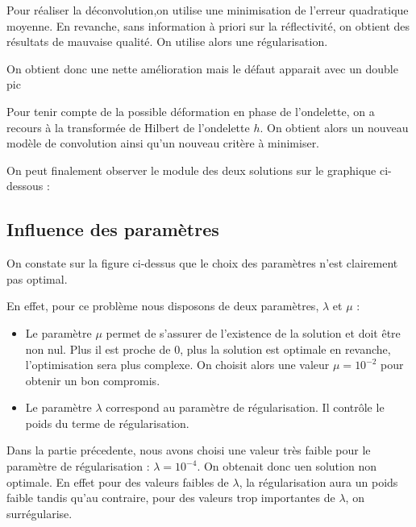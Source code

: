 \documentclass[12pt,a4paper,titlepage]{scrartcl}
\begin{document}

Pour réaliser la déconvolution,on utilise une minimisation de l'erreur
quadratique moyenne. En revanche, sans information à priori sur la
réflectivité, on obtient des résultats de mauvaise qualité. On utilise
alors une régularisation.


On obtient donc une nette amélioration mais le défaut apparait avec un
double pic


Pour tenir compte de la possible déformation en phase de l'ondelette,
on a recours à la transformée de Hilbert de l'ondelette $h$. On obtient
alors un nouveau modèle de convolution ainsi qu'un nouveau critère
à minimiser.



On peut finalement observer le module des deux solutions sur le graphique
ci-dessous :


\subsection{Influence des paramètres}

On constate sur la figure ci-dessus que le choix des paramètres n'est
clairement pas optimal.

En effet, pour ce problème nous disposons de deux paramètres, $\lambda$
et $\mu$ :

\begin{itemize}
    \item{Le paramètre $\mu$ permet de s'assurer de l'existence de la solution et
        doit être non nul. Plus il est proche de 0, plus la solution
        est optimale en revanche, l'optimisation sera plus complexe. On
        choisit alors une valeur $\mu = 10^{-2}$ pour obtenir un bon
        compromis.}
    \item{Le paramètre $\lambda$ correspond au paramètre de régularisation.
        Il contrôle le poids du terme de régularisation.}
\end{itemize}

Dans la partie précedente, nous avons choisi une valeur très faible pour
le paramètre de régularisation : $\lambda = 10^{-4}$. On obtenait donc
uen solution non optimale. En effet pour des valeurs faibles de $\lambda$,
la régularisation aura un poids faible tandis qu'au contraire,
pour des valeurs trop importantes de $\lambda$, on surrégularise.
\end{document}
